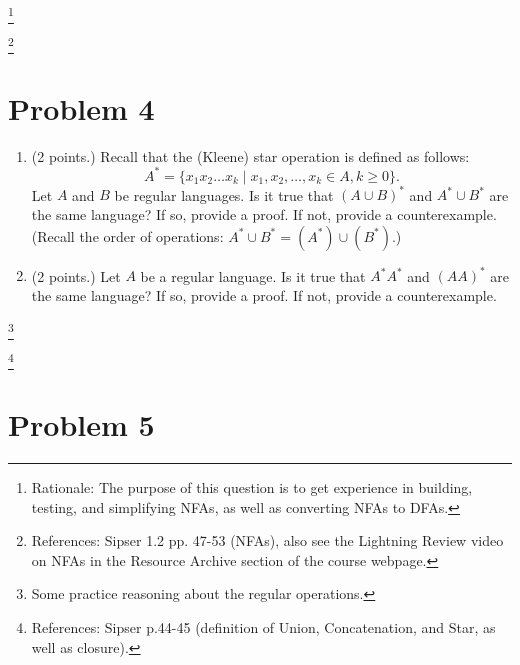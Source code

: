 \documentclass[letterpaper,11pt,twoside]{article}
\theoremstyle{plain}
\theoremstyle{definition}
\theoremstyle{remark}
\theoremstyle{restate}
\newcommand\blfootnote[1]{%
  \begingroup
  \renewcommand\thefootnote{}\footnote{#1}%
  \addtocounter{footnote}{-1}%
  \endgroup
}
\begin{document}
\blfootnote{Rationale: The purpose of this question is to get experience in building, testing, and simplifying NFAs, as well as converting NFAs to DFAs. }
\blfootnote{References: Sipser 1.2 pp. 47-53 (NFAs), also see the Lightning Review video on NFAs in the Resource Archive section of the course webpage. }

\clearpage
\section*{Problem 4}

\begin{enumerate}
    \item (2 points.) Recall that the (Kleene) star operation is defined as follows:
    \[
        A^* = \{ x_1x_2\dots x_k \; | \; x_1, x_2, \dots, x_k \in A, k \geq 0\}.
    \]
    Let $A$ and $B$ be regular languages. Is it true that $(A \cup B)^*$ and $A^* \cup B^*$ are the same language? If so, provide a proof. If not, provide a counterexample. (Recall the order of operations: $A^*\cup B^* = (A^*) \cup (B^*)$.)

    \item (2 points.) Let $A$ be a regular language. Is it true that $A^*A^*$ and $(AA)^*$ are the same language? If so, provide a proof. If not, provide a counterexample.

\end{enumerate}

\blfootnote{Some practice reasoning about the regular operations.}
\blfootnote{References: Sipser p.44-45 (definition of Union, Concatenation, and Star, as well as closure).}

\clearpage
\section*{Problem 5}
\end{document}

